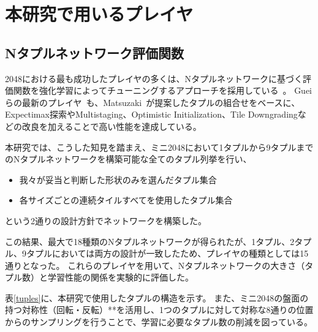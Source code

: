 \section{本研究で用いるプレイヤ}
\subsection{Nタプルネットワーク評価関数}
\label{sec:Ntuple}

2048における最も成功したプレイヤの多くは、Nタプルネットワークに基づく評価関数を強化学習によってチューニングするアプローチを採用している~\cite{SzJa14}。
Gueiらの最新のプレイヤ~\cite{GuCW22}も、Matsuzaki~\cite{Mats16}が提案したタプルの組合せをベースに、Expectimax探索やMultistaging\cite{YWHC16}、Optimistic Initialization、Tile Downgrading\cite{GuCW22}などの改良を加えることで高い性能を達成している。

本研究では、こうした知見を踏まえ、ミニ2048において1タプルから9タプルまでのNタプルネットワークを構築可能な全てのタプル列挙を行い、
\begin{itemize}
  \item 我々が妥当と判断した形状のみを選んだタプル集合
  \item 各サイズごとの連続タイルすべてを使用したタプル集合
\end{itemize}
    という2通りの設計方針でネットワークを構築した。

この結果、最大で18種類のNタプルネットワークが得られたが、1タプル、2タプル、9タプルにおいては両方の設計が一致したため、プレイヤの種類としては15通りとなった。
これらのプレイヤを用いて、Nタプルネットワークの大きさ（タプル数）と学習性能の関係を実験的に評価した。

表\ref{tuples}に、本研究で使用したタプルの構造を示す。
また、ミニ2048の盤面の持つ対称性（回転・反転）**を活用し、1つのタプルに対して対称な8通りの位置からのサンプリングを行うことで、学習に必要なタプル数の削減を図っている。


